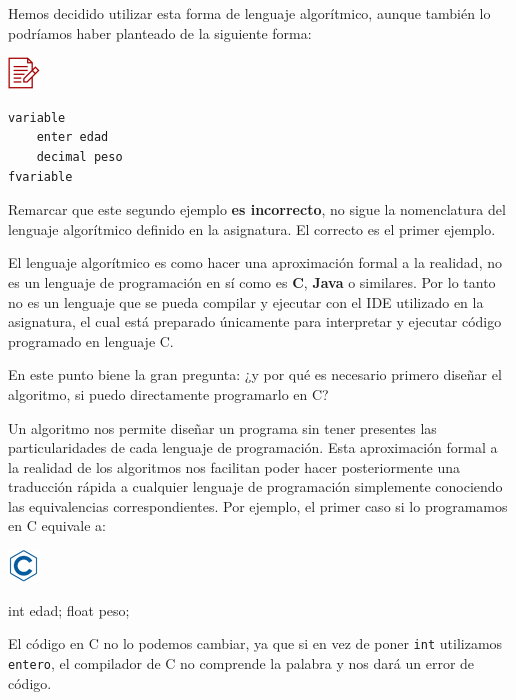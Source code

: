 \documentclass[
]{book}
\newenvironment{Shaded}{\begin{snugshade}}{\end{snugshade}}
\newcommand{\DataTypeTok}[1]{\textcolor[rgb]{0.13,0.29,0.53}{#1}}
\newcommand{\NormalTok}[1]{#1}
\begin{document}
Hemos decidido utilizar esta forma de lenguaje algorítmico, aunque también lo podríamos haber planteado de la siguiente forma:

\includegraphics{./img/alg_err.png}

\begin{verbatim}
variable
    enter edad
    decimal peso
fvariable
\end{verbatim}

Remarcar que este segundo ejemplo \textbf{es incorrecto}, no sigue la nomenclatura del lenguaje algorítmico definido en la asignatura. El correcto es el primer ejemplo.

El lenguaje algorítmico es como hacer una aproximación formal a la realidad, no es un lenguaje de programación en sí como es \textbf{C}, \textbf{Java} o similares. Por lo tanto no es un lenguaje que se pueda compilar y ejecutar con el IDE utilizado en la asignatura, el cual está preparado únicamente para interpretar y ejecutar código programado en lenguaje C.

En este punto biene la gran pregunta: ¿y por qué es necesario primero diseñar el algoritmo, si puedo directamente programarlo en C?

Un algoritmo nos permite diseñar un programa sin tener presentes las particularidades de cada lenguaje de programación. Esta aproximación formal a la realidad de los algoritmos nos facilitan poder hacer posteriormente una traducción rápida a cualquier lenguaje de programación simplemente conociendo las equivalencias correspondientes. Por ejemplo, el primer caso si lo programamos en C equivale a:

\includegraphics{./img/c.png}

\begin{Shaded}
\begin{Highlighting}[]
\DataTypeTok{int}\NormalTok{ edad;}
\DataTypeTok{float}\NormalTok{ peso;}
\end{Highlighting}
\end{Shaded}

El código en C no lo podemos cambiar, ya que si en vez de poner \texttt{int} utilizamos \texttt{entero}, el compilador de C no comprende la palabra y nos dará un error de código.
\end{document}
